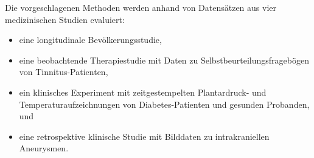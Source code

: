 \documentclass[
  oneside]{book}
\providecommand{\tightlist}{%
  \setlength{\itemsep}{0pt}\setlength{\parskip}{0pt}}
\begin{document}
Die vorgeschlagenen Methoden werden anhand von Datensätzen aus vier medizinischen Studien evaluiert:

\begin{itemize}
\tightlist
\item
  eine longitudinale Bevölkerungsstudie,
\item
  eine beobachtende Therapiestudie mit Daten zu Selbstbeurteilungsfragebögen von Tinnitus-Patienten,
\item
  ein klinisches Experiment mit zeitgestempelten Plantardruck- und Temperaturaufzeichnungen von Diabetes-Patienten und gesunden Probanden, und
\item
  eine retrospektive klinische Studie mit Bilddaten zu intrakraniellen Aneurysmen.
\end{itemize}

\end{document}
